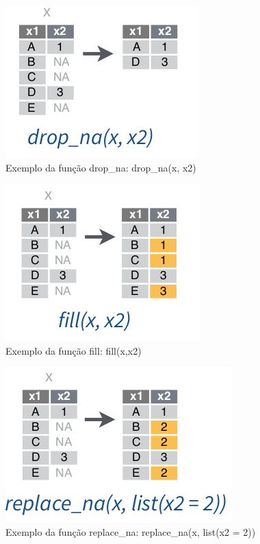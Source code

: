 \documentclass[12pt,a4paper,oneside]{erdc}
\begin{document}
\begin{figure}[htpb]
	\centering
	\includegraphics[width=.5\linewidth]{../figs/BP_Curso_TecComp_00_2019_f03-09.png}
	\caption{Exemplo da função drop\_na: drop\_na(x, x2)}
	\label{fig:bpcursoteccomp002019f03-09}
\end{figure}



\begin{figure}[htpb]
	\centering
	\includegraphics[width=.5\linewidth]{../figs/BP_Curso_TecComp_00_2019_f03-10.png}
	\caption{Exemplo da função fill: fill(x,x2)}
	\label{fig:bpcursoteccomp002019f03-10}
\end{figure}




\begin{figure}[htpb]
	\centering
	\includegraphics[width=.5\linewidth]{../figs/BP_Curso_TecComp_00_2019_f03-11.png}
	\caption{Exemplo da função replace\_na: replace\_na(x, list(x2 = 2))}
	\label{fig:bpcursoteccomp002019f03-11}
\end{figure}
\end{document}
